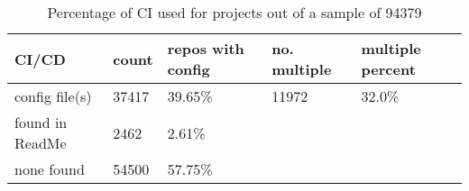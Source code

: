 
    \begin{table}[h]
\begin{tabular}{|l|l|l|l|l|}
\hline
    CI/CD & \textbf{count} & \textbf{repos with config} & \textbf{no. multiple} & \textbf{multiple percent}   \\ \hline
config file(s) &           37417     & 39.65\%                                & 11972          & 32.0\%             \\ \hline
found in ReadMe & 2462     & 2.61\%                                &             &             \\ \hline
none found &            54500     & 57.75\%                                &             &             \\ \hline
\end{tabular}
\caption[Percentage of CI used for projects]{Percentage of CI used for projects out of a sample of 94379 }
\label{table_ci_usage}
\end{table}
    